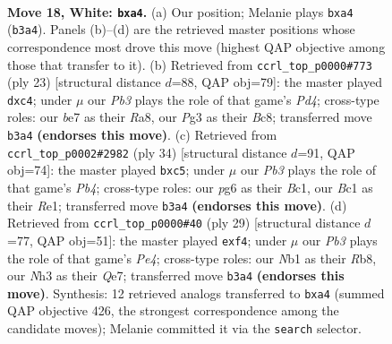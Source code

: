 \documentclass[11pt]{article}
\begin{document}
\clearpage

\begin{figure}[p]\centering
\begin{subfigure}{0.46\textwidth}\centering
\resizebox{\linewidth}{!}{%
\newchessgame
\chessboard[
  setfen={rn1q1rk1/4bp2/5np1/2p4p/pp1p3P/1P1P2PN/P3PPK1/RNB1QR2 w - - 0 18},
  showmover=false,
  pgfstyle=straightmove, color=movearrow, markmove={b3-a4}
]}
\caption{}
\end{subfigure}\hfill
\begin{subfigure}{0.46\textwidth}\centering
\resizebox{\linewidth}{!}{%
\newchessgame
\chessboard[
  setfen={r1b2rk1/pppnqp2/4p1pp/3p2P1/2PP3P/2P1PN2/P4PB1/R2QK2R b KQ - 0 12},
  showmover=false,
  pgfstyle=straightmove, color=movearrow, markmove={d5-c4}
]}
\caption{}
\end{subfigure}
\\[4pt]
\begin{subfigure}{0.46\textwidth}\centering
\resizebox{\linewidth}{!}{%
\newchessgame
\chessboard[
  setfen={2r5/1r1qpkb1/p2p1npp/1pp5/1PP5/3P1NP1/P3QPKP/1RB1R3 w - - 1 18},
  showmover=false,
  pgfstyle=straightmove, color=movearrow, markmove={b4-c5}
]}
\caption{}
\end{subfigure}\hfill
\begin{subfigure}{0.46\textwidth}\centering
\resizebox{\linewidth}{!}{%
\newchessgame
\chessboard[
  setfen={1rb1r1k1/2p1qpp1/p2p1n1p/P1p1p3/4PP2/2PPB2P/2PN2P1/R2QR1K1 b - - 0 15},
  showmover=false,
  pgfstyle=straightmove, color=movearrow, markmove={e5-f4}
]}
\caption{}
\end{subfigure}
\caption{\textbf{Move 18, White: \texttt{bxa4}.} (a) Our position; Melanie plays \texttt{bxa4} (\texttt{b3a4}). Panels (b)--(d) are the retrieved master positions whose correspondence most drove this move (highest QAP objective among those that transfer to it). (b) Retrieved from \texttt{ccrl\_top\_p0000\#773} (ply 23) [structural distance $d$=88, QAP obj=79]: the master played \texttt{dxc4}; under $\mu$ our \emph{Pb3} plays the role of that game's \emph{Pd4}; cross-type roles: our \emph{b}e7 as their \emph{R}a8, our \emph{P}g3 as their \emph{B}c8; transferred move \texttt{b3a4} \textbf{(endorses this move)}. (c) Retrieved from \texttt{ccrl\_top\_p0002\#2982} (ply 34) [structural distance $d$=91, QAP obj=74]: the master played \texttt{bxc5}; under $\mu$ our \emph{Pb3} plays the role of that game's \emph{Pb4}; cross-type roles: our \emph{p}g6 as their \emph{B}c1, our \emph{B}c1 as their \emph{R}e1; transferred move \texttt{b3a4} \textbf{(endorses this move)}. (d) Retrieved from \texttt{ccrl\_top\_p0000\#40} (ply 29) [structural distance $d$=77, QAP obj=51]: the master played \texttt{exf4}; under $\mu$ our \emph{Pb3} plays the role of that game's \emph{Pe4}; cross-type roles: our \emph{N}b1 as their \emph{R}b8, our \emph{N}h3 as their \emph{Q}e7; transferred move \texttt{b3a4} \textbf{(endorses this move)}. Synthesis: 12 retrieved analogs transferred to \texttt{bxa4} (summed QAP objective 426, the strongest correspondence among the candidate moves); Melanie committed it via the \texttt{search} selector.}
\label{fig:thought-m34}
\end{figure}
\end{document}
